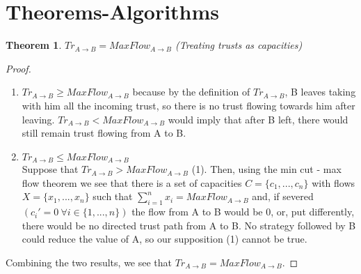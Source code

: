 \documentclass[11pt]{article}
\newtheorem{theorem}{Theorem}[section]
\theoremstyle{definition}
\theoremstyle{corollary}
\begin{document}
  \section{Theorems-Algorithms}
    \begin{theorem}
    $Tr_{A \rightarrow B} = MaxFlow_{A \rightarrow B}$ (Treating trusts as capacities)
    \end{theorem}
    \begin{proof} \ 
        \begin{enumerate}
           \item $Tr_{A \rightarrow B} \geq MaxFlow_{A \rightarrow B}$ because by the definition of $Tr_{A \rightarrow B}$,
           B leaves taking with him all the incoming trust, so there is no trust flowing towards him after leaving.
           $Tr_{A \rightarrow B} < MaxFlow_{A \rightarrow B}$ would imply that after B left, there would still remain trust
           flowing from A to B.
           \item $Tr_{A \rightarrow B} \leq MaxFlow_{A \rightarrow B}$ \\
           Suppose that $Tr_{A \rightarrow B} > MaxFlow_{A \rightarrow B}$ (1). Then, using the min cut - max flow theorem we
           see that there is a set of capacities $C= \{c_1,...,c_n\}$ with flows $X = \{x_1,...,x_n\}$ such that
           $\sum_{i=1}^{n}{x_i} = MaxFlow_{A \rightarrow B}$ and, if severed $(c_i' = 0\:\forall i \in \{1,...,n\})$ the flow
           from A to B would be $0$, or, put differently, there would be no directed trust path from A to B. No strategy
           followed by B could reduce the value of A, so our supposition (1) cannot be true.
        \end{enumerate}
        Combining the two results, we see that $Tr_{A \rightarrow B} = MaxFlow_{A \rightarrow B}$.
    \end{proof}
\end{document}
